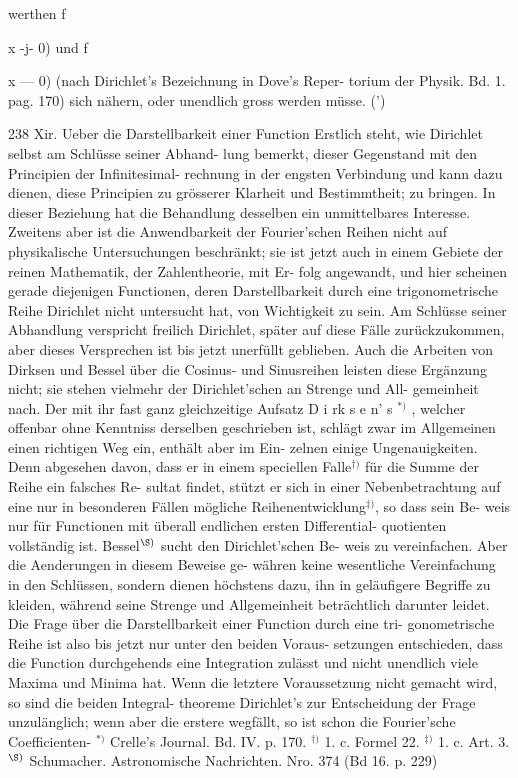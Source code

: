 \documentclass[11pt,a4paper]{article}
\begin{document}
werthen f{x  -j-  0)  und  f{x  ---  0)  (nach  Dirichlet's  Bezeichnung  in  Dove's  Reper-
torium  der  Physik.  Bd.  1.  pag.  170)  sich  nähern,  oder  unendlich  gross  werden
müsse.  (')
\newpage

238  Xir.    Ueber  die  Darstellbarkeit  einer  Function
Erstlich  steht,  wie  Dirichlet  selbst  am  Schlüsse  seiner  Abhand-
lung bemerkt,  dieser  Gegenstand  mit  den  Principien  der  Infinitesimal-
rechnung in  der  engsten  Verbindung  und  kann  dazu  dienen,  diese
Principien  zu  grösserer  Klarheit  und  Bestimmtheit;  zu  bringen.  In
dieser  Beziehung  hat  die  Behandlung  desselben  ein  unmittelbares
Interesse.
Zweitens  aber  ist  die  Anwendbarkeit  der  Fourier'schen  Reihen
nicht  auf  physikalische  Untersuchungen  beschränkt;  sie  ist  jetzt  auch
in  einem  Gebiete  der  reinen  Mathematik,  der  Zahlentheorie,  mit  Er-
folg angewandt,  und  hier  scheinen  gerade  diejenigen  Functionen,  deren
Darstellbarkeit  durch  eine  trigonometrische  Reihe  Dirichlet  nicht
untersucht  hat,  von  Wichtigkeit  zu  sein.
Am  Schlüsse  seiner  Abhandlung  verspricht  freilich  Dirichlet,
später  auf  diese  Fälle  zurückzukommen,  aber  dieses  Versprechen  ist
bis  jetzt  unerfüllt  geblieben.  Auch  die  Arbeiten  von  Dirksen  und
Bessel  über  die  Cosinus-  und  Sinusreihen  leisten  diese  Ergänzung
nicht;  sie  stehen  vielmehr  der  Dirichlet'schen  an  Strenge  und  All-
gemeinheit nach.  Der  mit  ihr  fast  ganz  gleichzeitige  Aufsatz  D  i rk  s  e n'  s  $^{*)}$ ,
welcher  offenbar  ohne  Kenntniss  derselben  geschrieben  ist,  schlägt
zwar  im  Allgemeinen  einen  richtigen  Weg  ein,  enthält  aber  im  Ein-
zelnen einige  Ungenauigkeiten.  Denn  abgesehen  davon,  dass  er  in
einem  speciellen  Falle$^{\dagger)}$  für  die  Summe  der  Reihe ein  falsches  Re-
sultat findet,  stützt  er  sich  in  einer  Nebenbetrachtung  auf  eine  nur  in
besonderen  Fällen  mögliche  Reihenentwicklung$^{\ddagger)}$,  so  dass  sein  Be-
weis nur  für  Functionen  mit  überall  endlichen  ersten  Differential-
quotienten vollständig  ist.  Bessel$^{\S)}$  sucht  den  Dirichlet'schen  Be-
weis zu  vereinfachen.  Aber  die  Aenderungen  in  diesem  Beweise  ge-
währen keine  wesentliche  Vereinfachung  in  den  Schlüssen,  sondern
dienen  höchstens  dazu,  ihn  in  geläufigere  Begriffe  zu  kleiden,  während
seine  Strenge  und  Allgemeinheit  beträchtlich  darunter  leidet.
Die  Frage  über  die  Darstellbarkeit  einer  Function  durch  eine  tri-
gonometrische Reihe  ist  also  bis  jetzt  nur  unter  den  beiden  Voraus-
setzungen entschieden,  dass  die  Function  durchgehends  eine  Integration
zulässt  und  nicht  unendlich  viele  Maxima  und  Minima  hat.  Wenn  die
letztere  Voraussetzung  nicht  gemacht  wird,  so  sind  die  beiden  Integral-
theoreme Dirichlet's  zur  Entscheidung  der  Frage  unzulänglich;  wenn
aber  die  erstere  wegfällt,  so  ist  schon  die  Fourier'sche  Coefficienten-
$^{*)}$  Crelle's  Journal.     Bd.  IV.  p.  170.
$^{\dagger)}$  1.  c.  Formel  22.
$^{\ddagger)}$  1.  c.  Art.  3.
$^{\S)}$  Schumacher.    Astronomische  Nachrichten.     Nro.  374  (Bd    16.  p.  229)
\newpage

}}
\end{document}
